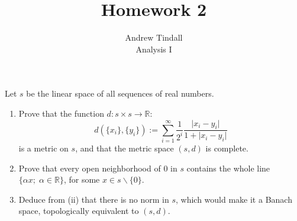\documentclass[12pt]{article}
\newcommand{\R}{\mathbb{R}}
\newcommand{\bs}{\backslash}
\theoremstyle{definition}
\newenvironment{problem}[2][Problem]{\begin{trivlist}
\item[\hskip \labelsep {\bfseries #1}\hskip \labelsep {\bfseries #2.}]}{\end{trivlist}}
\begin{document}
 
 
\title{Homework 2 }
\author{Andrew Tindall\\
	Analysis I}
 
\maketitle
\begin{problem}{1}
Let $s$ be the linear space of all sequences of real numbers.
\begin{enumerate}[label=(\roman*)]
    \item Prove that the function $d : s \times s \to \R$:
    \[
        d(\{x_i\}, \{y_i\}) := \sum_{i=1}^\infty \frac{1}{2^i}\frac{\lvert x_i - y_i \rvert}{1 + \lvert x_i - y_i\rvert}
    \] is a metric on $s$, and that the metric space $(s,d)$ is complete.
    
    \item Prove that every open neighborhood of $0$ in $s$ contains the whole line $\{\alpha x;\;\alpha \in \R\}$, for some $x \in s \bs \{0\}$.
    \item Deduce from (ii) that there is no norm in $s$, which would make it a Banach space, topologically equivalent to $(s,d)$.
\end{enumerate}
\end{problem}
\end{document}
